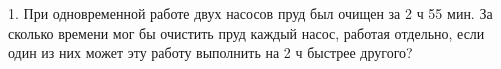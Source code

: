 1. При одновременной работе двух насосов пруд был очищен за 2 ч 55 мин. За сколько времени мог бы очистить пруд каждый насос, работая отдельно, если один из них может эту работу выполнить на 2 ч быстрее другого?\\
